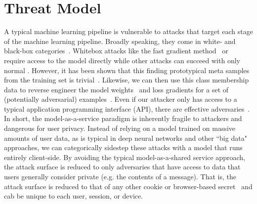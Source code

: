 \documentclass[conference]{IEEEtran}
\begin{document}

\section{Threat Model}
\label{threat}
A typical machine learning pipeline is vulnerable to attacks that target each stage of the machine learning pipeline. Broadly speaking, they come in white- and black-box categories~\cite{meyers}. Whitebox attacks like the fast gradient method~\cite{fgm} or~\cite{deepfool} require access to the model directly while other attacks can succeed with only normal . However, it has been shown that this finding prototypical meta samples from the training set is trivial~\cite{chakraborty_adversarial_2018}. Likewise, we can then use this class membership data to reverse engineer the model weights~\cite{} and loss gradients for a set of (potentially adversarial) examples~\cite{}. Even if our attacker only has access to a typical application programming interface (API), there are effective adversaries~\cite{hopskipjump}. In short, the model-as-a-service paradigm is inherently fragile to attackers and dangerous for user privacy. Instead of relying on a model trained on massive amounts of user data, as is typical in deep neural networks and other ``big data" approaches, we can categorically sidestep these attacks with a model that runs entirely client-side. By avoiding the typical model-as-a-shared service approach, the attack surface is reduced to only adversaries that have access to data that users generally consider private (e.g. the contents of a message). That is, the attack surface is reduced to that of any other cookie or browser-based secret~\cite{} and cab be unique to each user, session, or device.
\end{document}
